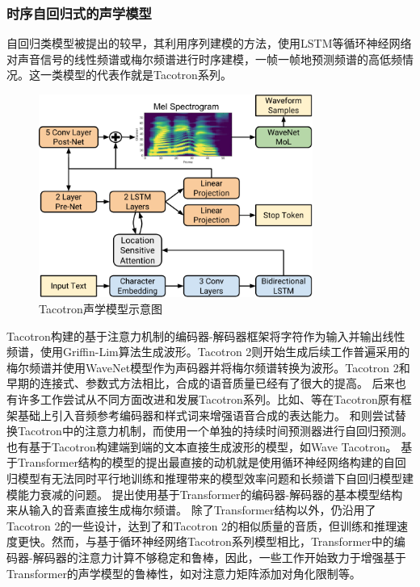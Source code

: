 \subsubsection{时序自回归式的声学模型}
自回归类模型被提出的较早，其利用序列建模的方法，使用LSTM等循环神经网络对声音信号的线性频谱或梅尔频谱进行时序建模，一帧一帧地预测频谱的高低频情况。这一类模型的代表作就是Tacotron系列。
\begin{figure}[ht]
\centering
  \includegraphics[width=0.80\textwidth]{figure/related/tacotron2.pdf}
  \caption{Tacotron声学模型示意图}
\end{figure}
Tacotron\citep{tacotron}构建的基于注意力机制的编码器-解码器框架将字符作为输入并输出线性频谱，使用Griffin-Lim算法\citep{GriffinLim}生成波形。Tacotron 2\citep{shen2018natural}则开始生成后续工作普遍采用的梅尔频谱并使用WaveNet\citep{vanwavenet}模型作为声码器并将梅尔频谱转换为波形。Tacotron 2和早期的连接式、参数式方法相比，合成的语音质量已经有了很大的提高。
后来也有许多工作尝试从不同方面改进和发展Tacotron系列。比如\citet{gsttacotron}、\citet{reftacotron}等在Tacotron原有框架基础上引入音频参考编码器和样式词来增强语音合成的表达能力。
\citet{nonattentivetacotron}和\citet{durian}则尝试替换Tacotron中的注意力机制，而使用一个单独的持续时间预测器进行自回归预测。
也有基于Tacotron构建端到端的文本直接生成波形的模型，如Wave Tacotron\citep{wavetacotron}。
基于Transformer结构的模型的提出最直接的动机就是使用循环神经网络构建的自回归模型有无法同时平行地训练和推理带来的模型效率问题和长频谱下自回归模型建模能力衰减的问题。
\citet{transformertts}提出使用基于Transformer的编码器-解码器的基本模型结构来从输入的音素直接生成梅尔频谱。
\citet{transformertts}除了Transformer结构以外，仍沿用了Tacotron 2的一些设计，达到了和Tacotron 2的相似质量的音质，但训练和推理速度更快。然而，与基于循环神经网络Tacotron系列模型相比，Transformer中的编码器-解码器的注意力计算不够稳定和鲁棒，因此，一些工作开始致力于增强基于Transformer的声学模型的鲁棒性，如对注意力矩阵添加对角化限制\citep{robutrans}等。

